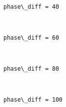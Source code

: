 \documentclass[11pt]{article}
\begin{document}
    \begin{center}
    \end{center}
    { \hspace*{\fill} \\}
    
    \begin{Verbatim}[commandchars=\\\{\}]
phase\_diff = 40

    \end{Verbatim}

    \begin{center}
    \end{center}
    { \hspace*{\fill} \\}
    
    \begin{Verbatim}[commandchars=\\\{\}]
phase\_diff = 60

    \end{Verbatim}

    \begin{center}
    \end{center}
    { \hspace*{\fill} \\}
    
    \begin{Verbatim}[commandchars=\\\{\}]
phase\_diff = 80

    \end{Verbatim}

    \begin{center}
    \end{center}
    { \hspace*{\fill} \\}
    
    \begin{Verbatim}[commandchars=\\\{\}]
phase\_diff = 100

    \end{Verbatim}

    \begin{center}
    \end{center}
    { \hspace*{\fill} \\}
    
\end{document}
